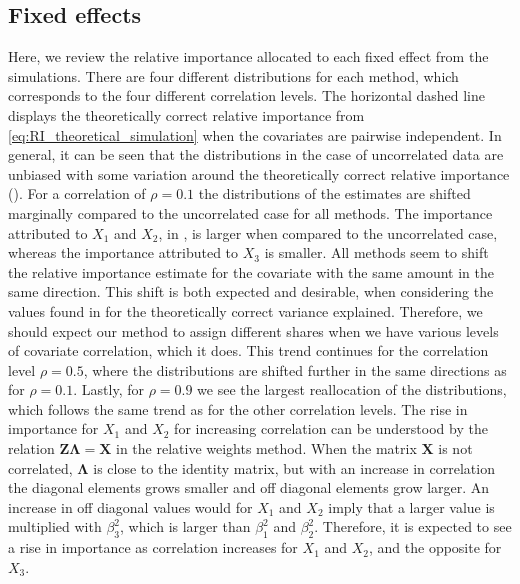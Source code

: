 \subsection{Fixed effects}
\label{sec:relimp_fixed}
Here, we review the relative importance allocated to each fixed effect from the simulations.
There are four different distributions for each method, which corresponds to the four different correlation levels. 
The horizontal dashed line displays the theoretically correct relative importance from \eqref{eq:RI_theoretical_simulation} when the covariates are pairwise independent. 
\newline
\newline
In general, it can be seen that the distributions in the case of uncorrelated data are unbiased with some variation around the theoretically correct relative importance ().
For a correlation of $\rho=0.1$ the distributions of the estimates are shifted marginally compared to the uncorrelated case for all methods.
The importance attributed to $X_1$ and $X_2$, in , is larger when compared to the uncorrelated case, whereas the importance attributed to $X_3$ is smaller.
All methods seem to shift the relative importance estimate for the covariate with the same amount in the same direction.
This shift is both expected and desirable, when considering the values found in  for the theoretically correct variance explained. 
Therefore, we should expect our method to assign different shares when we have various levels of covariate correlation, which it does.
This trend continues for the correlation level $\rho=0.5$, where the distributions are shifted further in the same directions as for $\rho=0.1$.
Lastly, for $\rho=0.9$ we see the largest reallocation of the distributions, which follows the same trend as for the other correlation levels.
\newline
\newline
The rise in importance for $X_1$ and $X_2$ for increasing correlation can be understood by the relation $\mathbf{Z}\boldsymbol{\Lambda}=\mathbf{X}$ in the relative weights method. 
When the matrix $\mathbf{X}$ is not correlated, $\boldsymbol{\Lambda}$ is close to the identity matrix, but with an increase in correlation the diagonal elements grows smaller and off diagonal elements grow larger.
An increase in off diagonal values would for $X_1$ and $X_2$ imply that a larger value is multiplied with $\beta_3^2$, which is larger than $\beta_1^2$ and $\beta_2^2$. 
Therefore, it is expected to see a rise in importance as correlation increases for $X_1$ and $X_2$, and the opposite for $X_3$.
